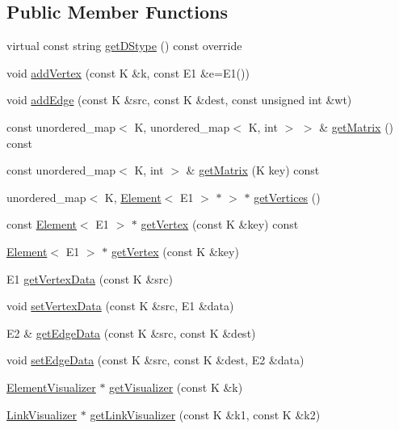 \subsection*{Public Member Functions}
\begin{DoxyCompactItemize}
\item 
virtual const string \hyperlink{classbridges_1_1_graph_adj_matrix_aeb9fc6a229cd233b899873cb07b2ff65}{get\+D\+Stype} () const  override
\item 
void \hyperlink{classbridges_1_1_graph_adj_matrix_a613fc91a0e056254192e45810405ac6e}{add\+Vertex} (const K \&k, const E1 \&e=E1())
\item 
void \hyperlink{classbridges_1_1_graph_adj_matrix_a785f15a8ca7857a72c34e51ae0c24834}{add\+Edge} (const K \&src, const K \&dest, const unsigned int \&wt)
\item 
const unordered\+\_\+map$<$ K, unordered\+\_\+map$<$ K, int $>$ $>$ \& \hyperlink{classbridges_1_1_graph_adj_matrix_afb9eb777798a5aba1274922838900e8f}{get\+Matrix} () const 
\item 
const unordered\+\_\+map$<$ K, int $>$ \& \hyperlink{classbridges_1_1_graph_adj_matrix_acd2af782ff76d4df73cf9e5534be4c6c}{get\+Matrix} (K key) const 
\item 
unordered\+\_\+map$<$ K, \hyperlink{classbridges_1_1_element}{Element}$<$ E1 $>$ $\ast$ $>$ $\ast$ \hyperlink{classbridges_1_1_graph_adj_matrix_a83f79301ef6807c2a40f288c808f758b}{get\+Vertices} ()
\item 
const \hyperlink{classbridges_1_1_element}{Element}$<$ E1 $>$ $\ast$ \hyperlink{classbridges_1_1_graph_adj_matrix_a28cb8b12ecd6ae85c333888a24a30c3c}{get\+Vertex} (const K \&key) const 
\item 
\hyperlink{classbridges_1_1_element}{Element}$<$ E1 $>$ $\ast$ \hyperlink{classbridges_1_1_graph_adj_matrix_a5a565f419080f4aea685a89c98223920}{get\+Vertex} (const K \&key)
\item 
E1 \hyperlink{classbridges_1_1_graph_adj_matrix_a11be29f76acebc6fd9a495ba81dc883d}{get\+Vertex\+Data} (const K \&src)
\item 
void \hyperlink{classbridges_1_1_graph_adj_matrix_a0dcc7220d850052aea47fccfd52192e0}{set\+Vertex\+Data} (const K \&src, E1 \&data)
\item 
E2 \& \hyperlink{classbridges_1_1_graph_adj_matrix_abbbb63d19c803973b51aa4379731e177}{get\+Edge\+Data} (const K \&src, const K \&dest)
\item 
void \hyperlink{classbridges_1_1_graph_adj_matrix_ab078dbb442bbbb028568a4f724289a48}{set\+Edge\+Data} (const K \&src, const K \&dest, E2 \&data)
\item 
\hyperlink{classbridges_1_1_element_visualizer}{Element\+Visualizer} $\ast$ \hyperlink{classbridges_1_1_graph_adj_matrix_a895b044adb939413fc695c15415b848b}{get\+Visualizer} (const K \&k)
\item 
\hyperlink{classbridges_1_1_link_visualizer}{Link\+Visualizer} $\ast$ \hyperlink{classbridges_1_1_graph_adj_matrix_a52652abff91b98257e17aea6f9560128}{get\+Link\+Visualizer} (const K \&k1, const K \&k2)
\end{DoxyCompactItemize}


